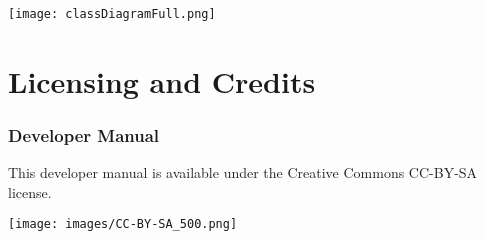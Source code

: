 \newenvironment{changemargin}[2]{%
\begin{list}{}{%
\setlength{\topsep}{0pt}%
\setlength{\leftmargin}{#1}%
\setlength{\rightmargin}{#2}%
\setlength{\listparindent}{\parindent}%
\setlength{\itemindent}{\parindent}%
\setlength{\parsep}{\parskip}%
}%
\item[]}{\end{list}}

\newpage
\begin{landscape}
\begin{changemargin}{-2.cm}{-3cm}
\thispagestyle{empty}
\texttt{[image: classDiagramFull.png]}
\end{changemargin}
\end{landscape}
\newpage


\chapter{Licensing and Credits}


\subsection*{Developer Manual}
This developer manual is available under the Creative Commons CC-BY-SA license.

\begin{center}
	\texttt{[image: images/CC-BY-SA\_500.png]}
\end{center}











